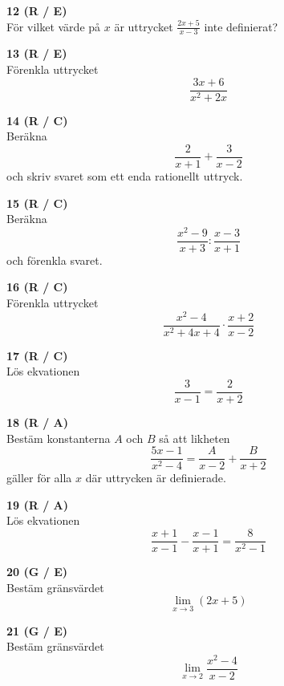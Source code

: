 \documentclass[12pt]{article}
\begin{document}
\noindent
\textbf{12 (R / E)} \\
För vilket värde på $x$ är uttrycket $\frac{2x + 5}{x - 3}$ inte definierat?

\vspace{0.3cm}

\noindent
\textbf{13 (R / E)} \\
Förenkla uttrycket
\[
\frac{3x + 6}{x^2 + 2x}
\]

\vspace{0.5cm}

\noindent
\textbf{14 (R / C)} \\
Beräkna
\[
\frac{2}{x + 1} + \frac{3}{x - 2}
\]
och skriv svaret som ett enda rationellt uttryck.

\vspace{0.5cm}

\noindent
\textbf{15 (R / C)} \\
Beräkna
\[
\frac{x^2 - 9}{x + 3} : \frac{x - 3}{x + 1}
\]
och förenkla svaret.

\vspace{0.5cm}

\noindent
\textbf{16 (R / C)} \\
Förenkla uttrycket
\[
\frac{x^2 - 4}{x^2 + 4x + 4} \cdot \frac{x + 2}{x - 2}
\]

\vspace{0.5cm}

\noindent
\textbf{17 (R / C)} \\
Lös ekvationen
\[
\frac{3}{x - 1} = \frac{2}{x + 2}
\]

\vspace{0.5cm}

\noindent
\textbf{18 (R / A)} \\
Bestäm konstanterna $A$ och $B$ så att likheten
\[
\frac{5x - 1}{x^2 - 4} = \frac{A}{x - 2} + \frac{B}{x + 2}
\]
gäller för alla $x$ där uttrycken är definierade.

\vspace{0.5cm}

\noindent
\textbf{19 (R / A)} \\
Lös ekvationen
\[
\frac{x + 1}{x - 1} - \frac{x - 1}{x + 1} = \frac{8}{x^2 - 1}
\]

\newpage

\noindent
\textbf{20 (G / E)} \\
Bestäm gränsvärdet
\[
\lim_{x \to 3} (2x + 5)
\]

\vspace{0.3cm}

\noindent
\textbf{21 (G / E)} \\
Bestäm gränsvärdet
\[
\lim_{x \to 2} \frac{x^2 - 4}{x - 2}
\]
\end{document}
